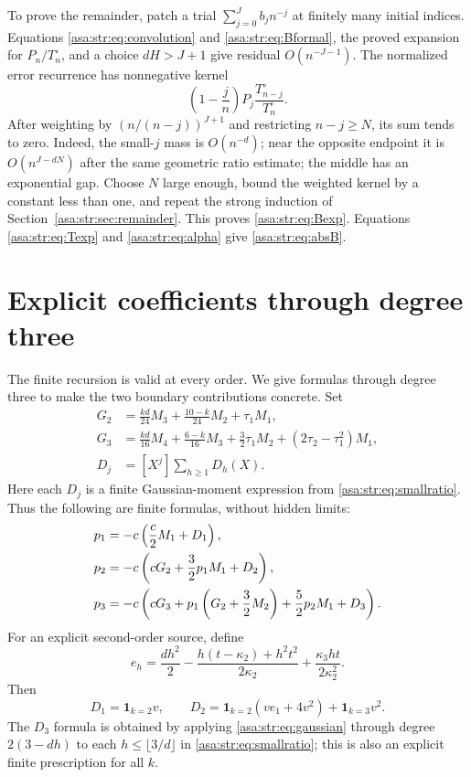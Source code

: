 \documentclass[11pt,letterpaper]{article}
\theoremstyle{remark}\newtheorem{remark}[theorem]{Remark}
\numberwithin{equation}{section}
\newcommand{\ind}{\mathbf 1}\newcommand{\fall}[2]{(#1)_{\underline{#2}}}
\begin{document}
To prove the remainder, patch a trial $\sum_{j=0}^Jb_jn^{-j}$ at finitely many initial indices. Equations \eqref{asa:str:eq:convolution} and \eqref{asa:str:eq:Bformal}, the proved expansion for $P_n/T^{\circ}_n$, and a choice $dH>J+1$ give residual $O(n^{-J-1})$. The normalized error recurrence has nonnegative kernel
\[
 \left(1-\frac jn\right)P_j\frac{T^{\circ}_{n-j}}{T^{\circ}_n}.
\]
After weighting by $(n/(n-j))^{J+1}$ and restricting $n-j\ge N$, its sum tends to zero. Indeed, the small-$j$ mass is $O(n^{-d})$; near the opposite endpoint it is $O(n^{J-dN})$ after the same geometric ratio estimate; the middle has an exponential gap. Choose $N$ large enough, bound the weighted kernel by a constant less than one, and repeat the strong induction of Section~\ref{asa:str:sec:remainder}. This proves \eqref{asa:str:eq:Bexp}. Equations \eqref{asa:str:eq:Texp} and \eqref{asa:str:eq:alpha} give \eqref{asa:str:eq:absB}.

\section{Explicit coefficients through degree three}\label{asa:str:sec:low}
The finite recursion is valid at every order. We give formulas through degree three to make the two boundary contributions concrete. Set
\begin{align*}
 G_2&=\frac{kd}{24}M_3+\frac{10-k}{24}M_2+\tau_1M_1,\\
 G_3&=\frac{kd}{16}M_4+\frac{6-k}{16}M_3
       +\frac32\tau_1M_2+(2\tau_2-\tau_1^2)M_1,\\
 D_j&=[X^j]\sum_{h\ge1}D_h(X).
\end{align*}
Here each $D_j$ is a finite Gaussian-moment expression from \eqref{asa:str:eq:smallratio}. Thus the following are finite formulas, without hidden limits:
\begin{align}
 p_1&=-c\left(\frac c2M_1+D_1\right),\notag\\
 p_2&=-c\left(cG_2+\frac32p_1M_1+D_2\right),\label{asa:str:eq:p23}\\
 p_3&=-c\left(cG_3+p_1\left(G_2+\frac32M_2\right)
                    +\frac52p_2M_1+D_3\right).\notag
\end{align}
For an explicit second-order source, define
\[
 e_h=\frac{dh^2}{2}
 -\frac{h(t-\kappa_2)+h^2t^2}{2\kappa_2}
 +\frac{\kappa_3ht}{2\kappa_2^2}.
\]
Then
\[
 D_1=\ind_{k=2}v,\qquad
 D_2=\ind_{k=2}(ve_1+4v^2)+\ind_{k=3}v^2.
\]
The $D_3$ formula is obtained by applying \eqref{asa:str:eq:gaussian} through degree $2(3-dh)$ to each $h\le\lfloor3/d\rfloor$ in \eqref{asa:str:eq:smallratio}; this is also an explicit finite prescription for all $k$.
\end{document}
